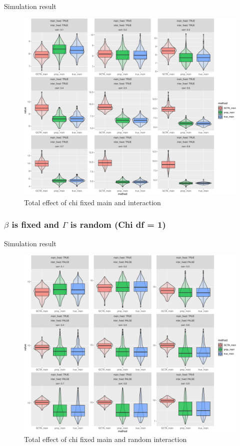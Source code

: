 \documentclass[]{article}
\begin{document}
Simulation result

\begin{figure}
\centering
\includegraphics{Simulation_report_files/figure-latex/main_fixed_fixed_chi_combine_df_1-1.pdf}
\caption{Total effect of chi fixed main and interaction}
\end{figure}

\clearpage

\subsubsection{\texorpdfstring{\(\beta\) is fixed and \(\Gamma\) is
random (Chi df =
1)}{\textbackslash{}beta is fixed and \textbackslash{}Gamma is random (Chi df = 1)}}\label{beta-is-fixed-and-gamma-is-random-chi-df-1}

Simulation result

\begin{figure}
\centering
\includegraphics{Simulation_report_files/figure-latex/main_fixed_random_chi_combine_df_1-1.pdf}
\caption{Total effect of chi fixed main and random interaction}
\end{figure}
\end{document}
